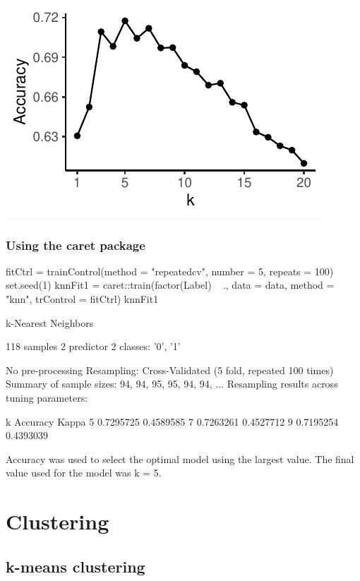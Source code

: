 \documentclass[a4paper]{article}\usepackage[]{graphicx}\usepackage[]{xcolor}
\makeatletter
\def\maxwidth{ %
  \ifdim\Gin@nat@width>\linewidth
    \linewidth
  \else
    \Gin@nat@width
  \fi
}
\makeatother
\begin{document}
\begin{Schunk}
{\centering \includegraphics[width=\maxwidth]{figure/listings-unnamed-chunk-459-2} 

}

\end{Schunk}
\subsubsection{Using the caret package}
\begin{Schunk}
\begin{Sinput}
fitCtrl = trainControl(method = "repeatedcv", number = 5, repeats = 100)
set.seed(1)
knnFit1 = caret::train(factor(Label) ~ ., data = data, method = "knn", 
                       trControl = fitCtrl)
knnFit1
\end{Sinput}
\begin{Soutput}
k-Nearest Neighbors 

118 samples
  2 predictor
  2 classes: '0', '1' 

No pre-processing
Resampling: Cross-Validated (5 fold, repeated 100 times) 
Summary of sample sizes: 94, 94, 95, 95, 94, 94, ... 
Resampling results across tuning parameters:

  k  Accuracy   Kappa    
  5  0.7295725  0.4589585
  7  0.7263261  0.4527712
  9  0.7195254  0.4393039

Accuracy was used to select the optimal model using the largest value.
The final value used for the model was k = 5.
\end{Soutput}
\end{Schunk}
\newpage

\section{Clustering}\label{sec:34}
\subsection{k-means clustering}
\end{document}
